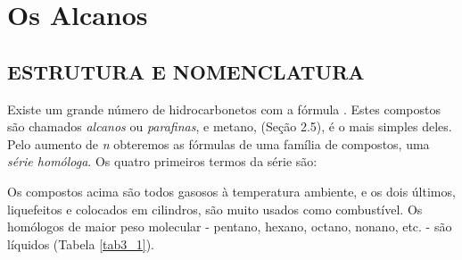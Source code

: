 \chapter{Os Alcanos}
\section{ESTRUTURA E NOMENCLATURA}
Existe um grande número de hidrocarbonetos com a fórmula . Estes compostos são chamados \textit{alcanos} ou \textit{parafinas}, e metano,  (Seção 2.5), é o mais simples deles. Pelo aumento de \emph{n} obteremos as fórmulas de uma família de compostos, uma \textit{série homóloga}. Os quatro primeiros termos da série são:

\begin{tightcenter}
    \chemnameinit{}
    \qquad
    \qquad
    \qquad
    \chemnameinit{}
\end{tightcenter}

\noindent Os compostos acima são todos gasosos à temperatura ambiente, e os dois últimos, liquefeitos e colocados em cilindros, são muito usados como combustível. Os homólogos de maior peso molecular - pentano, hexano, octano, nonano, etc. - são líquidos (Tabela \ref{tab3_1}).

